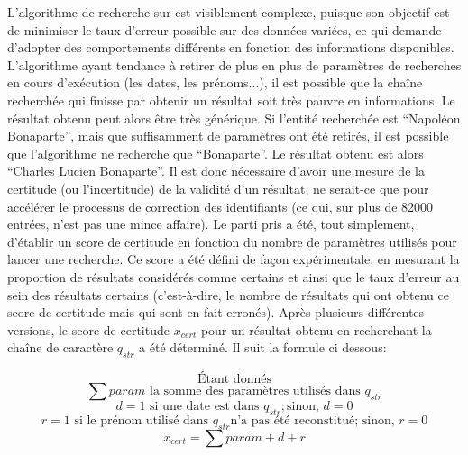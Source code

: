 L'algorithme de recherche sur \wkd{} est visiblement complexe, puisque son objectif est de minimiser le taux d'erreur possible sur des données variées, ce qui demande d'adopter des comportements différents en fonction des informations disponibles. L'algorithme ayant tendance à retirer de plus en plus de paramètres de recherches en cours d'exécution (les dates, les prénoms...), il est possible que la chaîne recherchée qui finisse par obtenir un résultat soit très pauvre en informations. Le résultat obtenu peut alors être très générique. Si l'entité recherchée est \enquote{Napoléon Bonaparte}, mais que suffisamment de paramètres ont été retirés, il est possible que l'algorithme ne recherche que \enquote{Bonaparte}. Le résultat obtenu est alors \href{https://www.wikidata.org/w/index.php?search=bonaparte&search=bonaparte&title=Special%3ASearch&go=Go&ns0=1&ns120=1}{\enquote{Charles Lucien Bonaparte}}. Il est donc nécessaire d'avoir une mesure de la certitude (ou l'incertitude) de la validité d'un résultat, ne serait-ce que pour accélérer le processus de correction des identifiants (ce qui, sur plus de 82000 entrées, n'est pas une mince affaire). Le parti pris a été, tout simplement, d'établir un score de certitude en fonction du nombre de paramètres utilisés pour lancer une recherche. Ce score a été défini de façon expérimentale, en mesurant la proportion de résultats considérés comme certains et ainsi que le taux d'erreur au sein des résultats certains (c'est-à-dire, le nombre de résultats qui ont obtenu ce score de certitude mais qui sont en fait erronés). Après plusieurs différentes versions, le score de certitude \(x_{cert}\) pour un résultat obtenu en recherchant la chaîne de caractère \(q_{str}\) a été déterminé. Il suit la formule ci dessous:

\begin{displaymath}
	\text{Étant donnés}
\end{displaymath}
\begin{displaymath}
	 \sum param \text{ la somme des paramètres utilisés dans } q_{str}
\end{displaymath}
\begin{displaymath}
	d = 1 \text{ si une date est dans } q_{str}; \text{sinon, } d = 0
\end{displaymath}
\begin{displaymath}
	r = 1 \text{ si le prénom utilisé dans } q_{str} \text{n'a pas été reconstitué; sinon, } r = 0
\end{displaymath}
\begin{displaymath}
	x_{cert} = \sum param + d + r  
\end{displaymath}

